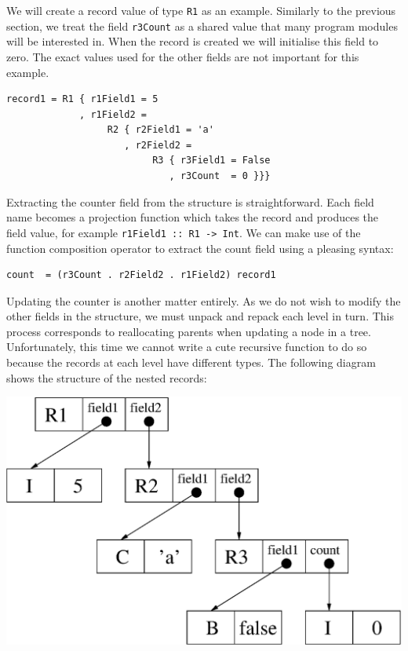 We will create a record value of type \texttt{R1} as an example. Similarly to the previous section, we treat the field \texttt{r3Count} as a shared value that many program modules will be interested in. When the record is created we will initialise this field to zero. The exact values used for the other fields are not important for this example.

\begin{lstlisting}
record1 = R1 { r1Field1 = 5
             , r1Field2 = 
                  R2 { r2Field1 = 'a'
                     , r2Field2 =
                          R3 { r3Field1 = False
                             , r3Count  = 0 }}}
\end{lstlisting}

Extracting the counter field from the structure is straightforward. Each field name becomes a projection function which takes the record and produces the field value, for example \texttt{r1Field1 :: R1 -> Int}. We can make use of the function composition operator to extract the count field using a pleasing syntax:

\begin{lstlisting}
count  = (r3Count . r2Field2 . r1Field2) record1
\end{lstlisting}

Updating the counter is another matter entirely. As we do not wish to modify the other fields in the structure, we must unpack and repack each level in turn. This process corresponds to reallocating parents when updating a node in a tree. Unfortunately, this time we cannot write a cute recursive function to do so because the records at each level have different types. The following diagram shows the structure of the nested records:

\begin{center}
\includegraphics[scale=0.5]{1-Introduction/fig/destructive/broadcast-record}
\end{center}

